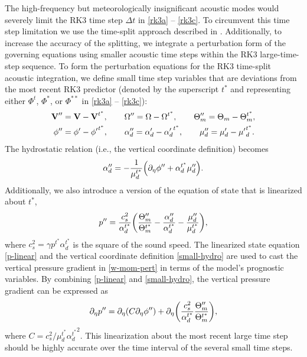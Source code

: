 The high-frequency but meteorologically insignificant acoustic modes
would severely limit the RK3 time step $\Delta t$ in \eqref{rk3a} --
\eqref{rk3c}.  To circumvent this time step limitation we use the 
time-split approach described in \citet{wicker02}.  Additionally, to increase the
accuracy of the splitting, we integrate 
a perturbation form of the governing equations using smaller acoustic
time steps within the RK3 large-time-step sequence.
To form the perturbation
equations for the RK3 time-split acoustic integration, we define small
time step variables that are deviations from the most recent RK3
predictor (denoted by the superscript $t^*$ and representing either
$\Phi^t$, $\Phi^*$, or $\Phi^{**}$ in \eqref{rk3a} -- \eqref{rk3c}): 
%
\begin{align} 
\hbox{\bf V}'' &= \hbox{\bf V} -\hbox{\bf V}^{t^*}, ~~~~~~
\Omega'' = \Omega - \Omega^{t^*}, ~~~~~~ \Theta_m'' = \Theta_m -
\Theta_m^{t^*}, \notag \\ \phi'' &= \phi' - {\phi'}^{t^*}, 
~~~~~~ \alpha_d''= \alpha_d' - {\alpha_d'}^{t^*}, ~~~~~~
\mu_d''= \mu_d' - {\mu'}_d^{t^*}.  \notag 
\end{align} 
% 
\noindent 
The hydrostatic relation (i.e., the vertical coordinate definition) becomes 
% 
\begin{equation}
\alpha_d'' = -{1\over\mu_d^{t^*}}\Bigl(\partial_\eta \phi'' + \alpha_d^{t^*}\mu_d''
\Bigr).  
\label{small-hydro} 
\end{equation} 
% 
\noindent
Additionally, we also
introduce a version of the equation of state that is linearized about $t^*$, 
%
\begin{equation} p'' = {c_s^2\over\alpha_d^{t^*}} \biggl({\Theta_m''\over\Theta_m^{t^*}}
-{\alpha_d''\over\alpha_d^{t^*}} - {\mu_d''\over\mu_d^{t^*}}\biggr), 
\label{p-linear}
\end{equation} 
% 
\noindent 
where $c_s^2 = \gamma p^{t^*} \alpha_d^{t^*}$ is the
square of the sound speed.
The linearized
state equation \eqref{p-linear} and the vertical coordinate definition
\eqref{small-hydro} are used to cast the vertical pressure gradient in
\eqref{w-mom-pert} in terms of the model's prognostic variables.
By combining \eqref{p-linear} and \eqref{small-hydro}, the vertical
pressure gradient can be expressed as
%
\begin{equation}
  \partial_\eta p'' = 
     \partial_\eta (C \partial_\eta \phi'') 
   +
\partial_\eta\biggl({c_s^2\over\alpha_d^{t^*}}
{\Theta_m''\over\Theta_m^{t^*}}\biggr),
\label{pz-linear}
\end{equation}
%
\noindent
where $C=c_s^2/\mu_d^{t^*}{\alpha^{t^*}_d}^2$. This linearization about the most
recent large time step should be highly accurate over the time interval of
the several small time steps.


